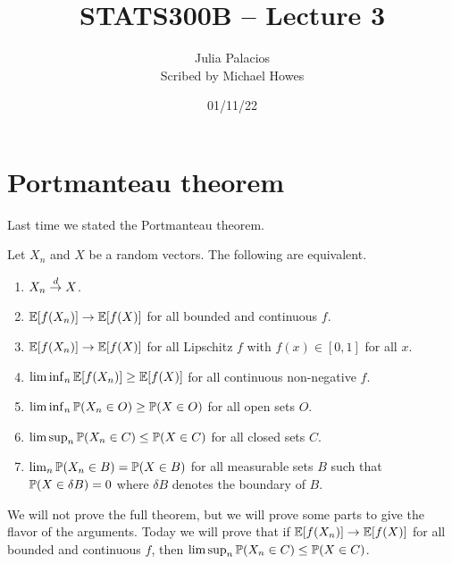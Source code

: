 




\title{STATS300B -- Lecture 3}
\author{Julia Palacios\\ Scribed by Michael Howes}
\date{01/11/22}

\pagestyle{fancy}
\fancyhf{}


\maketitle
\tableofcontents
\section{Portmanteau theorem}
Last time we stated the Portmanteau theorem.
\begin{theorem}
    Let $X_n$ and $X$ be a random vectors. The following are equivalent.
    \begin{enumerate}
        \item $X_n \stackrel{d}{\to} X$.
        \item ${\mathbb{E}}[f(X_n)] \to {\mathbb{E}}[f(X)]$ for all bounded and continuous $f$.
        \item ${\mathbb{E}}[f(X_n)] \to {\mathbb{E}}[f(X)]$ for all Lipschitz $f$ with $f(x) \in [0,1]$ for all $x$.
        \item $\lim\inf_n {\mathbb{E}}[f(X_n)] \ge {\mathbb{E}}[f(X)]$ for all continuous non-negative $f$.
        \item $\liminf_n {\mathbb{P}}(X_n \in O) \ge {\mathbb{P}}(X\in O)$ for all open sets $O$.
        \item $\limsup_n {\mathbb{P}}(X_n \in C) \le {\mathbb{P}}(X \in C)$ for all closed sets $C$.
        \item $\lim_n {\mathbb{P}}(X_n \in B) = {\mathbb{P}}(X\in B)$ for all measurable sets $B$ such that ${\mathbb{P}}(X \in \delta B) = 0$ where $\delta B$ denotes the boundary of $B$. 
    \end{enumerate}
\end{theorem}
We will not prove the full theorem, but we will prove some parts to give the flavor of the arguments. Today we will prove that if ${\mathbb{E}}[f(X_n)] \to {\mathbb{E}}[f(X)]$ for all bounded and continuous $f$, then $\limsup_n {\mathbb{P}}(X_n \in C) \le {\mathbb{P}}(X \in C)$.
